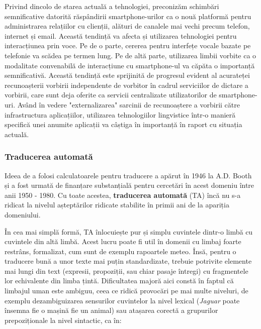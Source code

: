 \documentclass[]{../../metanetpaper}
\begin{document}
\begin{multicols}{2}
Privind dincolo de starea actuală a tehnologiei, preconizăm schimbări semnificative datorită răspândirii smartphone-urilor ca o nouă platformă pentru administrarea relațiilor cu clienții, alături de canalele mai vechi precum telefon, internet și email. Această tendință va afecta și utilizarea tehnologiei pentru interacțiunea prin voce. Pe de o parte, cererea pentru interfețe vocale bazate pe telefonie va scădea pe termen lung. Pe de altă parte, utilizarea limbii vorbite ca o modalitate convenabilă de interacțiune cu smartphone-ul va căpăta o importanță semnificativă. Această tendință este sprijinită de progresul evident al acurateței recunoașterii vorbirii independente de vorbitor în cadrul serviciilor de dictare a vorbirii, care sunt deja oferite ca servicii centralizate utilizatorilor de smartphone-uri. Având în vedere "externalizarea" sarcinii de recunoaștere a vorbirii către infrastructura aplicațiilor, utilizarea tehnologiilor lingvistice într-o manieră specifică unei anumite aplicații va câștiga în importanță în raport cu situația actuală.

\subsubsection{Traducerea automată}

Ideea de a folosi calculatoarele pentru traducere a apărut în 1946 la A.D. Booth și a fost urmată de finanțare substanțială pentru cercetări în acest domeniu între anii 1950 - 1980. Cu toate acestea, \textbf{traducerea automată} (TA) încă nu s-a ridicat la nivelul așteptărilor ridicate stabilite în primii ani de la apariția domeniului.


În cea mai simplă formă, TA înlocuiește pur și simplu cuvintele dintr-o limbă cu cuvintele din altă limbă. Acest lucru poate fi util în domenii cu limbaj foarte restrâns, formalizat, cum sunt de exemplu rapoartele meteo. Însă, pentru o traducere bună a unor texte mai puțin standardizate, trebuie potrivite elemente mai lungi din text (expresii, propoziții, sau chiar pasaje întregi) cu fragmentele lor echivalente din limba țintă. Dificultatea majoră aici constă în faptul că limbajul uman este ambiguu, ceea ce ridică provocări pe mai multe niveluri, de exemplu dezambiguizarea sensurilor cuvintelor la nivel lexical (\textit{Jaguar} poate însemna fie o mașină fie un animal) sau atașarea corectă a grupurilor prepoziționale la nivel sintactic, ca în:


\end{multicols}
\end{document}
